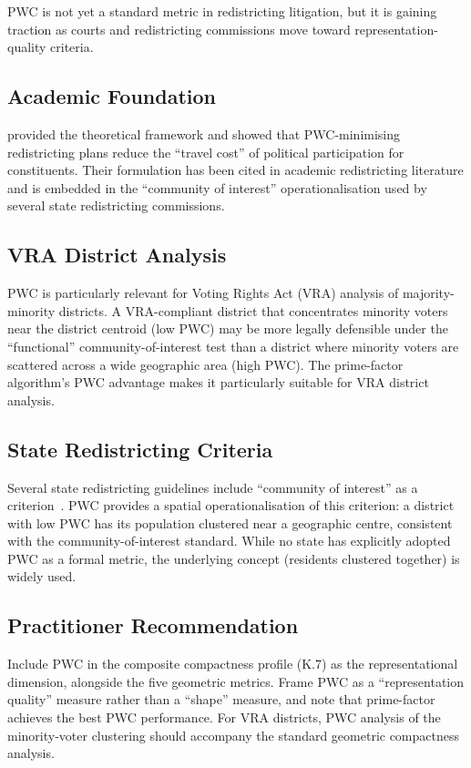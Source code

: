 PWC is not yet a standard metric in redistricting litigation, but it is gaining
traction as courts and redistricting commissions move toward representation-quality
criteria.

\subsection{Academic Foundation}

\citet{fryer2011measuring} provided the theoretical framework and showed that
PWC-minimising redistricting plans reduce the ``travel cost'' of political
participation for constituents.
Their formulation has been cited in academic redistricting literature and
is embedded in the ``community of interest'' operationalisation used by
several state redistricting commissions.

\subsection{VRA District Analysis}

PWC is particularly relevant for Voting Rights Act (VRA) analysis of
majority-minority districts.
A VRA-compliant district that concentrates minority voters near the district
centroid (low PWC) may be more legally defensible under the ``functional''
community-of-interest test than a district where minority voters are scattered
across a wide geographic area (high PWC).
The prime-factor algorithm's PWC advantage makes it particularly suitable
for VRA district analysis.

\subsection{State Redistricting Criteria}

Several state redistricting guidelines include ``community of interest'' as
a criterion~\citep{ncsl2021criteria}.
PWC provides a spatial operationalisation of this criterion: a district with
low PWC has its population clustered near a geographic centre, consistent with
the community-of-interest standard.
While no state has explicitly adopted PWC as a formal metric, the underlying
concept (residents clustered together) is widely used.

\subsection{Practitioner Recommendation}

Include PWC in the composite compactness profile (K.7) as the representational
dimension, alongside the five geometric metrics.
Frame PWC as a ``representation quality'' measure rather than a ``shape'' measure,
and note that prime-factor achieves the best PWC performance.
For VRA districts, PWC analysis of the minority-voter clustering should
accompany the standard geometric compactness analysis.
